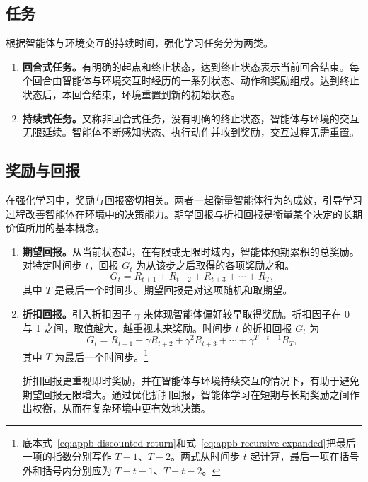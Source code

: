 \subsection{任务}
根据智能体与环境交互的持续时间，强化学习任务分为两类。
\begin{enumerate}
\item \textbf{回合式任务。}有明确的起点和终止状态，达到终止状态表示当前回合结束。每个回合由智能体与环境交互时经历的一系列状态、动作和奖励组成。达到终止状态后，本回合结束，环境重置到新的初始状态。
\item \textbf{持续式任务。}又称非回合式任务，没有明确的终止状态，智能体与环境的交互无限延续。智能体不断感知状态、执行动作并收到奖励，交互过程无需重置。
\end{enumerate}

\subsection{奖励与回报}
\label{sec:appb-return}
在强化学习中，奖励与回报密切相关。两者一起衡量智能体行为的成效，引导学习过程改善智能体在环境中的决策能力。期望回报与折扣回报是衡量某个决定的长期价值所用的基本概念。
\begin{enumerate}
\item \textbf{期望回报。}从当前状态起，在有限或无限时域内，智能体预期累积的总奖励。对特定时间步 $t$，回报 $G_t$ 为从该步之后取得的各项奖励之和。
\begin{equation}
G_t=R_{t+1}+R_{t+2}+R_{t+3}+\cdots+R_T,
\label{eq:appb-return}
\end{equation}
其中 $T$ 是最后一个时间步。期望回报是对这项随机和取期望。
\item \textbf{折扣回报。}引入折扣因子 $\gamma$ 来体现智能体偏好较早取得奖励。折扣因子在 0 与 1 之间，取值越大，越重视未来奖励。时间步 $t$ 的折扣回报 $G_t$ 为
\begin{equation}
G_t=R_{t+1}+\gamma R_{t+2}+\gamma^2 R_{t+3}
+\cdots+\gamma^{T-t-1}R_T,
\label{eq:appb-discounted-return}
\end{equation}
其中 $T$ 为最后一个时间步。\footnote{底本式~\eqref{eq:appb-discounted-return}和式~\eqref{eq:appb-recursive-expanded}把最后一项的指数分别写作 $T-1$、$T-2$。两式从时间步 $t$ 起计算，最后一项在括号外和括号内分别应为 $T-t-1$、$T-t-2$。}

折扣回报更重视即时奖励，并在智能体与环境持续交互的情况下，有助于避免期望回报无限增大。通过优化折扣回报，智能体学习在短期与长期奖励之间作出权衡，从而在复杂环境中更有效地决策。
\end{enumerate}

